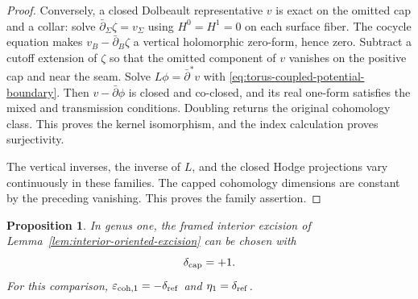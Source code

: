 \documentclass[11pt]{amsart}
\newtheorem{proposition}[theorem]{Proposition}
\theoremstyle{definition}
\theoremstyle{remark}
\theoremstyle{plain}
\begin{document}
\begin{proof}
Conversely, a closed Dolbeault representative
$v$ is exact on the omitted cap and a collar:
solve $\bar\partial_\Sigma\zeta=v_\Sigma$
using $H^0=H^1=0$ on each surface fiber.
The cocycle equation makes
$v_B-\bar\partial_B\zeta$ a vertical
holomorphic zero-form, hence zero.
Subtract a cutoff extension of $\zeta$
so that the omitted component of $v$
vanishes on the positive cap and near
the seam. Solve $L\phi=\bar\partial^*v$
with \eqref{eq:torus-coupled-potential-boundary}.
Then $v-\bar\partial\phi$ is closed
and co-closed, and its real one-form
satisfies the mixed and transmission
conditions. Doubling returns the
original cohomology class. This proves
the kernel isomorphism, and the index
calculation proves surjectivity.

The vertical inverses, the inverse of
$L$, and the closed Hodge projections
vary continuously in these families.
The capped cohomology dimensions are
constant by the preceding vanishing.
This proves the family assertion.
\end{proof}

\begin{proposition}\label{prop:torus-cap-complex-orientation}
In genus one, the framed interior excision of
Lemma~\ref{lem:interior-oriented-excision} can
be chosen with
\begin{equation}\label{eq:torus-cap-sign}
                           \delta_{\rm cap}=+1.
\end{equation}
For this comparison,
$\varepsilon_{{\rm coh},1}=-\delta_{\rm ref}$
and $\eta_1=\delta_{\rm ref}$.
\end{proposition}
\end{document}
